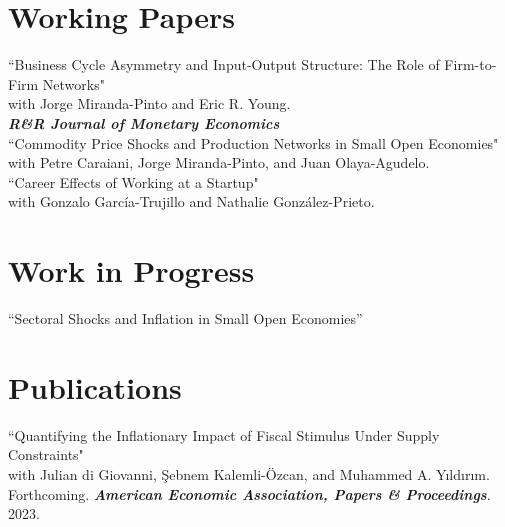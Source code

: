 \documentclass[11pt]{article}
\begin{document}
\section*{Working Papers}
``Business Cycle Asymmetry and Input-Output Structure: The Role of Firm-to-Firm Networks"\\
 with Jorge Miranda-Pinto and Eric R. Young.\\
 \textbf{\textit{R\&R Journal of Monetary Economics}}\\[-0.1in]

``Commodity Price Shocks and Production Networks in Small Open Economies"\\
 with Petre Caraiani, Jorge Miranda-Pinto, and Juan Olaya-Agudelo.\\[-0.1in]

 ``Career Effects of Working at a Startup"\\
 with Gonzalo Garc\'ia-Trujillo and Nathalie Gonz\'alez-Prieto.

\section*{Work in Progress}

``Sectoral Shocks and Inflation in Small Open Economies''\\[-0.1in]









\section*{Publications}

``Quantifying the Inflationary Impact of Fiscal Stimulus Under Supply Constraints"\\
with Julian di Giovanni, \c{S}ebnem Kalemli-\"{O}zcan, and Muhammed A. Y{\i}ld{\i}r{\i}m. \\
Forthcoming. \textbf{\textit{American Economic Association, Papers \& Proceedings}}. 2023.\\[-0.1in]
\end{document}
